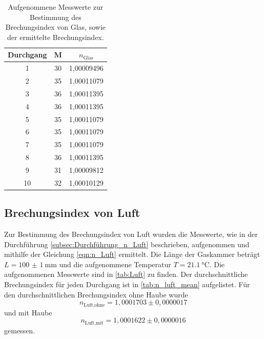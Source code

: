 \begin{table}[H]
  \centering
  \caption{Aufgenommene Messwerte zur Bestimmung des Brechungsindex von Glas, sowie der ermittelte Brechungsindex.}
  \label{tab:Glas}
  \begin{tabular}{c c c}
    \toprule
    Durchgang & M & $n_\text{Glas}$ \\
    \midrule
    1    &   30    &   1,00009496\\   
    2    &   35    &   1,00011079\\   
    3    &   36    &   1,00011395\\   
    4    &   36    &   1,00011395\\   
    5    &   35    &   1,00011079\\   
    6    &   35    &   1,00011079\\   
    7    &   35    &   1,00011079\\   
    8    &   36    &   1,00011395\\   
    9    &   31    &   1,00009812\\   
    10   &   32    &   1,00010129\\   
    \bottomrule
  \end{tabular}
\end{table}

\subsection{Brechungsindex von Luft}
\label{subsec:n_Luft}
Zur Bestimmung des Brechungsindex von Luft wurden die Messwerte, wie in der Durchführung \ref{subsec:Durchführung_n_Luft} beschrieben, aufgenommen und mithilfe der Gleichung \eqref{eqn:n_Luft} ermittelt.
Die Länge der Gaskammer beträgt $L = \SI[separate-uncertainty = true]{100(1)}{\milli\metre}$ \cite{anleitung} und die aufgenommene Temperatur $T = \SI{21.1}{\celsius}$.
Die aufgenommenen Messwerte sind in \autoref{tab:Luft} zu finden.
Der durchschnittliche Brechungsindex für jeden Durchgang ist in \autoref{tab:n_luft_mean} aufgelistet.
Für den durchschnittlichen Brechungsindex ohne Haube wurde
\begin{equation*}
  n_\text{Luft,ohne} = 1,0001703 \pm 0,0000017
\end{equation*}
und mit Haube 
\begin{equation*}
  n_\text{Luft,mit} =  1,0001622 \pm 0,0000016
\end{equation*}
gemessen.

